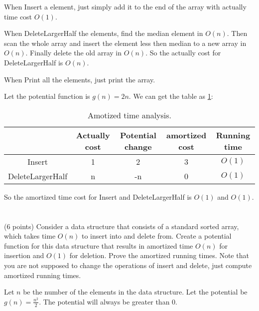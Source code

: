 \documentclass[paper=a4, fontsize=11pt]{scrartcl} %
\begin{document}
When Insert a element, just simply add it to the end of the array with
actually time cost $O(1)$.

When DeleteLargerHalf the elements, find the median element in $O(n)$.
Then scan the whole array and insert the element less then median to a
new array in $O(n)$.
Finally delete the old array in $O(n)$.
So the actually cost for DeleteLargerHalf is $O(n)$.

When Print all the elements, just print the array.

Let the potential function is $g(n)=2n$.
We can get the table as \ref{tab:2}:

\begin{table}[hp]
  \centering
  \begin{tabular}[hp]{ccccc}
    & Actually cost & Potential change & amortized cost & Running time\\
    \hline
    Insert & 1 & 2 & 3 & $O(1)$\\
    DeleteLargerHalf & n & -n & 0 & $O(1)$\\
  \end{tabular}
  \caption{Amotized time analysis.}
  \label{tab:2}
\end{table}

So the amortized time cost for Insert and DeleteLargerHalf is $O(1)$
and $O(1)$.

\pagebreak

\section{}

\begin{fancyquotes}
  (6 points) Consider a data structure that consists of a standard
  sorted array, which takes time $O(n)$ to insert into and delete
  from. Create a potential function for this data structure that
  results in amortized time $O(n)$ for insertion and $O(1)$ for
  deletion. Prove the amortized running times. Note that you are not
  supposed to change the operations of insert and delete, just compute
  amortized running times.
\end{fancyquotes}

Let $n$ be the number of the elements in the data structure.
Let the potential be $g(n) = \frac{n^2}{2}$.
The potential will always be greater than $0$.
\end{document}
